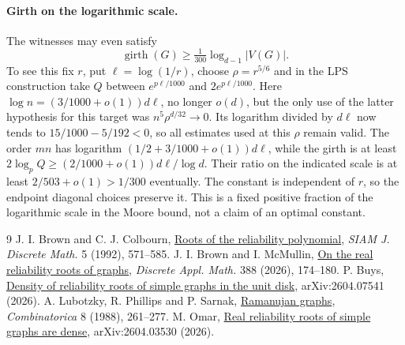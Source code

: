 \documentclass[11pt]{article}
\begin{document}
\paragraph{Girth on the logarithmic scale.}
The witnesses may even satisfy
\[
 \operatorname{girth}(G)\ge \tfrac1{300}\log_{d-1}|V(G)|.
\]
To see this fix $r$, put $\ell=\log(1/r)$, choose $\rho=r^{5/6}$ and in the LPS construction take $Q$ between $e^{p\ell/1000}$ and $2e^{p\ell/1000}$. Here $\log n=(3/1000+o(1))d\ell$, no longer $o(d)$, but the only use of the latter hypothesis for this target was $n^5\rho^{d/32}\to0$. Its logarithm divided by $d\ell$ now tends to $15/1000-5/192<0$, so all estimates used at this $\rho$ remain valid. The order $mn$ has logarithm $(1/2+3/1000+o(1))d\ell$, while the girth is at least $2\log_p Q\ge (2/1000+o(1))d\ell/\log d$. Their ratio on the indicated scale is at least $2/503+o(1)>1/300$ eventually. The constant is independent of $r$, so the endpoint diagonal choices preserve it. This is a fixed positive fraction of the logarithmic scale in the Moore bound, not a claim of an optimal constant.

\small
\begin{thebibliography}{9}
 J. I. Brown and C. J. Colbourn, \href{https://doi.org/10.1137/0405047}{Roots of the reliability polynomial}, \emph{SIAM J. Discrete Math.} 5 (1992), 571--585.
 J. I. Brown and I. McMullin, \href{https://doi.org/10.1016/j.dam.2026.03.037}{On the real reliability roots of graphs}, \emph{Discrete Appl. Math.} 388 (2026), 174--180.
 P. Buys, \href{https://arxiv.org/abs/2604.07541}{Density of reliability roots of simple graphs in the unit disk}, arXiv:2604.07541 (2026).
 A. Lubotzky, R. Phillips and P. Sarnak, \href{https://doi.org/10.1007/BF02126799}{Ramanujan graphs}, \emph{Combinatorica} 8 (1988), 261--277.
 M. Omar, \href{https://arxiv.org/abs/2604.03530}{Real reliability roots of simple graphs are dense}, arXiv:2604.03530 (2026).
\end{thebibliography}
\end{document}
